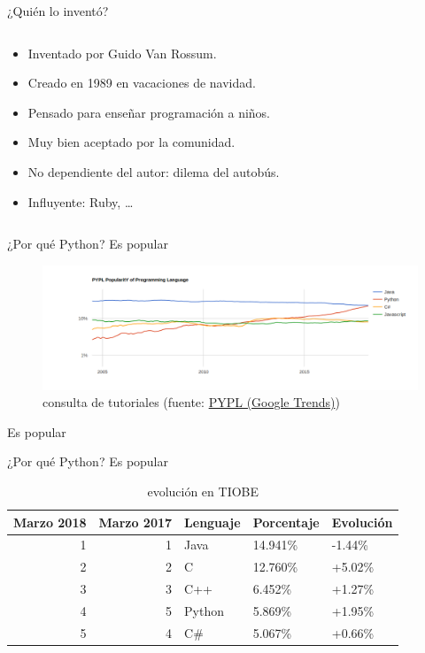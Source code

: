 \documentclass[bigger,unknownkeysallowed]{beamer}
\begin{document}
\begin{frame}[label={sec:org84a683a}]{¿Quién lo inventó?}
\begin{columns}
\begin{column}{0.8\columnwidth}
\begin{itemize}
\item Inventado por Guido Van Rossum.

\item Creado en 1989 en vacaciones de navidad.

\item Pensado para enseñar programación a niños.

\item Muy bien aceptado por la comunidad.

\item No dependiente del autor: dilema del autobús.

\item Influyente: Ruby, \ldots{}
\end{itemize}
\end{column}
\end{columns}
\end{frame}

\begin{frame}[label={sec:org5913aa9}]{¿Por qué Python? Es popular}
\begin{figure}[htbp]
\centering
\includegraphics[width=\textwidth]{popularidad_tutoriales.png}
\caption{consulta de tutoriales (fuente: \href{https://pypl.github.io/PYPL.html}{PYPL (Google Trends)})}
\end{figure}

\begin{center}
{\Large {\color{blue}Es popular}}
\end{center}
\end{frame}

\begin{frame}[label={sec:orgfcafb43}]{¿Por qué Python? Es popular}
\begin{table}[htbp]
\caption{evolución  en TIOBE}
\centering
\begin{tabular}{rrlll}
\hline
Marzo 2018 & Marzo 2017 & Lenguaje & Porcentaje & Evolución\\
\hline
1 & 1 & Java & 14.941\% & -1.44\%\\
2 & 2 & C & 12.760\% & +5.02\%\\
3 & 3 & C++ & 6.452\% & +1.27\%\\
4 & 5 & Python & 5.869\% & +1.95\%\\
5 & 4 & C\# & 5.067\% & +0.66\%\\
\hline
\end{tabular}
\end{table}
\end{frame}
\end{document}

